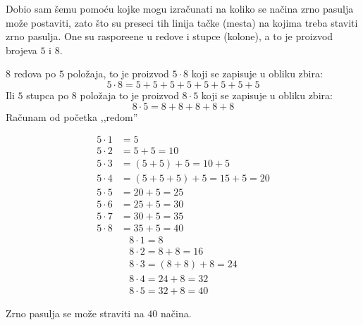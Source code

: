 \documentclass[a4paper,12pt]{book}
\begin{document}
    Dobio sam \v semu pomo\' cu kojke mogu izra\v cunati na koliko se na\v cina zrno pasulja mo\v ze postaviti,
    zato \v sto su preseci tih linija ta\v cke (mesta) na kojima treba staviti zrno pasulja. One su raspore\dj ene u redove i stupce (kolone), a to je proizvod brojeva $5$ i $8$.

    $8$ redova po $5$ polo\v zaja, to je proizvod $5 \cdot 8$ koji se zapisuje u obliku zbira:
    $$5 \cdot 8 = 5 + 5 + 5 + 5 + 5 + 5 + 5 + 5$$
    Ili $5$ stupca po $8$ polo\v zaja to je proizvod $8 \cdot 5$ koji se zapisuje u obliku zbira:
    $$8 \cdot 5 = 8 + 8 + 8 + 8 + 8$$
    Ra\v cunam od po\v cetka ,,redom''

    \begin{multicols}{2}
    \begin{align*}
        5 \cdot 1 &= 5 \\
        5 \cdot 2 &= 5 + 5 = 10\\
        5 \cdot 3 &= (5 + 5) + 5 = 10 + 5\\
        5 \cdot 4 &= (5 + 5 + 5) + 5 = 15 + 5 = 20\\
        5 \cdot 5 &= 20 + 5 = 25\\
        5 \cdot 6 &= 25 + 5 = 30\\
        5 \cdot 7 &= 30 + 5 = 35\\
        5 \cdot 8 &= 35 + 5 = 40
    \end{align*}
    \break
    \begin{align*}
        8 \cdot 1 = 8 \\
        8 \cdot 2 = 8 + 8 = 16 \\
        8 \cdot 3 = (8 + 8) + 8 = 24 \\
        8 \cdot 4 = 24 + 8 = 32 \\
        8 \cdot 5 = 32 + 8 = 40
    \end{align*}
    \end{multicols}
    Zrno pasulja se mo\v ze straviti na $40$ na\v cina.
\end{document}
